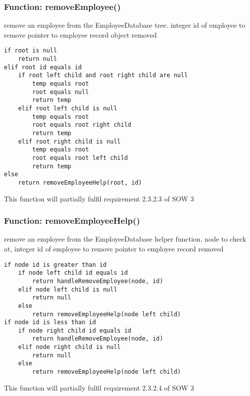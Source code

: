 \documentclass[12pt]{article}%
\newcounter{subsubsubsection}[subsubsection]
\begin{document}
\subsubsection{Function: removeEmployee()}
remove an employee from the EmployeeDatabase tree.
integer id of employee to remove
pointer to employee record object removed
\begin{verbatim}
if root is null
    return null
elif root id equals id
    if root left child and root right child are null
        temp equals root
        root equals null
        return temp
    elif root left child is null
        temp equals root
        root equals root right child
        return temp
    elif root right child is null
        temp equals root
        root equals root left child
        return temp
else
    return removeEmployeeHelp(root, id)
\end{verbatim}
This function will partially fulfil requirement 2.3.2.3 of SOW 3

\subsubsection{Function: removeEmployeeHelp()}
remove an employee from the EmployeeDatabase helper function.
node to check at, integer id of employee to remove
pointer to employee record removed
\begin{verbatim}
if node id is greater than id
    if node left child id equals id
        return handleRemoveEmployee(node, id)
    elif node left child is null
        return null
    else
        return removeEmployeeHelp(node left child)
if node id is less than id
    if node right child id equals id
        return handleRemoveEmployee(node, id)
    elif node right child is null
        return null
    else
        return removeEmployeeHelp(node left child)

\end{verbatim}
This function will partially fulfil requirement 2.3.2.4 of SOW 3
\end{document}

